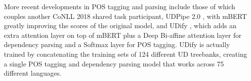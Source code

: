 More recent developments in POS tagging and parsing include those of \citet{straka-strakova-2019-evaluating} which couples another CoNLL 2018 shared task participant, UDPipe 2.0 \citep{straka-2018-udpipe}, with mBERT greatly improving the scores of the original model, and UDify \citep{kondratyuk-straka-2019-75}, which adds an extra attention layer on top of mBERT plus a Deep Bi-affine attention layer for dependency parsing and a Softmax layer for POS tagging. UDify is actually trained by concatenating the training sets of 124 different UD treebanks, creating a single POS tagging and dependency parsing model that works across 75 different languages.

